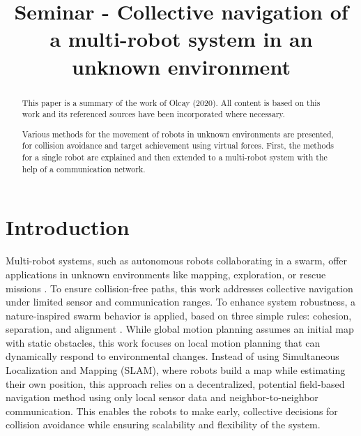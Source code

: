 \documentclass[conference]{IEEEtran}
\begin{document}
\title{Seminar - Collective navigation of a multi-robot system in an unknown environment}
\author{
}

\maketitle


\begin{abstract}
This paper is a summary of the work of Olcay (2020). 
All content is based on this work and its referenced sources have been 
incorporated where necessary.

Various methods for the movement of robots in unknown environments are presented,
for collision avoidance and target achievement using virtual forces. First, the methods
for a single robot are explained and then extended to a multi-robot system with the 
help of a communication network.
\end{abstract}

\section{Introduction}
\cite{Olcay.2020} Multi-robot systems, such as autonomous robots collaborating in a swarm, 
offer applications in unknown environments like mapping, exploration, or 
rescue missions \cite{Stormont.null}. 
To ensure collision-free paths, this work addresses 
collective navigation under limited sensor and communication ranges. To 
enhance system robustness, a nature-inspired swarm behavior is applied, 
based on three simple rules: cohesion, separation, and alignment 
\cite{Reynolds.1987}. 
While global motion planning assumes an initial map with static obstacles, 
this work focuses on local motion planning that can dynamically respond 
to environmental changes. Instead of using Simultaneous Localization and 
Mapping (SLAM), where robots build a map while estimating their own 
position, this approach relies on a decentralized, potential field-based 
navigation method using only local sensor data and neighbor-to-neighbor 
communication. This enables the robots to make early, collective decisions 
for collision avoidance while ensuring scalability and flexibility of 
the system.
\end{document}
